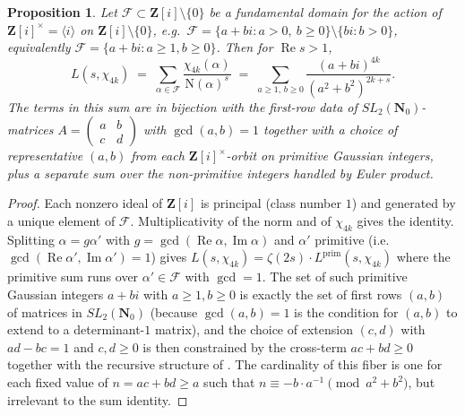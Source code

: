 \documentclass[11pt]{article}
\newtheorem{proposition}[theorem]{Proposition}
\theoremstyle{definition}
\newcommand{\Nz}{\mathbf{N}_0}
\newcommand{\Z}{\mathbf{Z}}
\newcommand{\SLNz}{SL_2(\Nz)}
\newcommand{\re}{\operatorname{Re}}
\newcommand{\im}{\operatorname{Im}}
\newcommand{\Norm}{\mathrm{N}}
\begin{document}
\begin{proposition}\label{prop:hecke-tree-sum}
Let $\mathcal{F} \subset \Z[i]\setminus\{0\}$ be a fundamental domain for the action of
$\Z[i]^\times = \langle i\rangle$ on $\Z[i]\setminus\{0\}$, e.g.\
$\mathcal{F} = \{a+bi : a > 0,\ b \ge 0\} \setminus \{bi : b > 0\}$, equivalently
$\mathcal{F} = \{a+bi : a\ge 1, b\ge 0\}$. Then for $\re s > 1$,
\[
  L(s,\chi_{4k}) \;=\; \sum_{\alpha\in\mathcal{F}} \frac{\chi_{4k}(\alpha)}{\Norm(\alpha)^s}
   \;=\; \sum_{a\ge 1,\, b\ge 0} \frac{(a+bi)^{4k}}{(a^2+b^2)^{2k+s}}.
\]
The terms in this sum are in bijection with the first-row data of $\SLNz$-matrices
$A = \left(\begin{smallmatrix} a & b \\ c & d \end{smallmatrix}\right)$ with $\gcd(a,b)=1$
together with a choice of representative $(a, b)$ from each
$\Z[i]^\times$-orbit on \emph{primitive} Gaussian integers, plus a separate sum over the
non-primitive integers handled by Euler product.
\end{proposition}

\begin{proof}
Each nonzero ideal of $\Z[i]$ is principal (class number $1$) and generated by a unique
element of $\mathcal{F}$. Multiplicativity of the norm and of $\chi_{4k}$ gives the
identity. Splitting $\alpha = g\alpha'$ with $g = \gcd(\re\alpha,\im\alpha)$ and $\alpha'$
primitive (i.e.\ $\gcd(\re\alpha',\im\alpha') = 1$) gives
$L(s,\chi_{4k}) = \zeta(2s)\cdot L^{\mathrm{prim}}(s,\chi_{4k})$ where the primitive sum
runs over $\alpha' \in \mathcal{F}$ with $\gcd = 1$. The set of such primitive
Gaussian integers $a+bi$ with $a\ge 1, b\ge 0$ is exactly the set of first rows
$(a,b)$ of matrices in $\SLNz$ (because $\gcd(a,b) = 1$ is the condition for $(a,b)$ to
extend to a determinant-$1$ matrix), and the choice of extension $(c,d)$ with
$ad - bc = 1$ and $c,d \ge 0$ is then constrained by the cross-term
$ac + bd \ge 0$ together with the recursive structure of \cite[\S 2]{shakov}. The
cardinality of this fiber is one for each fixed value of $n = ac+bd \ge a$ such that
$n \equiv -b \cdot a^{-1} \pmod{a^2+b^2}$, but irrelevant to the sum identity.
\end{proof}
\end{document}
